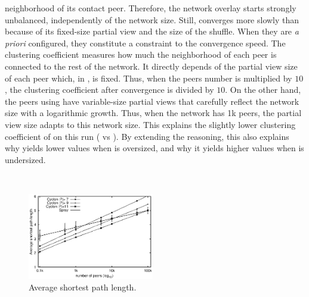 \begin{asparadesc}
  neighborhood of its contact peer. Therefore, the network overlay
  starts strongly unbalanced, independently of the network
  size. Still, \CYCLON converges more slowly than \SPRAY because of
  its fixed-size partial view and the size of the shuffle. When they
  are \emph{a priori} configured, they constitute a constraint to the
  convergence speed.  The clustering coefficient measures how much the
  neighborhood of each peer is connected to the rest of the
  network. It directly depends of the partial view size of each peer
  which, in \CYCLON, is fixed. Thus, when the peers number is
  multiplied by $10$, the clustering coefficient after convergence is
  divided by $10$. On the other hand, the peers using \SPRAY have
  variable-size partial views that carefully reflect the network size
  with a logarithmic growth. Thus, when the network has 1k peers, the
  partial view size adapts to this network size. This explains the
  slightly lower clustering coefficient of \SPRAY on this run ( vs ). By extending the reasoning, this also explains
  why \SPRAY yields lower values when \CYCLON is oversized, and why it
  yields higher values when \CYCLON is undersized.
\end{asparadesc}

\ \\

\begin{figure}
  \centering
  \includegraphics[width=0.49\textwidth]{img/avgpath.eps}
  \caption{\label{fig:avgpath}Average shortest path length.}
\end{figure}

